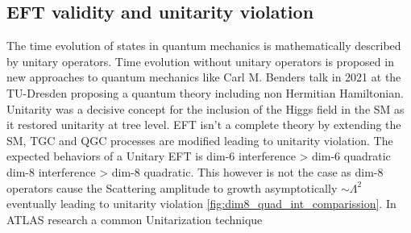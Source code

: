 \documentclass[../Bachelorarbeit.tex]{subfiles}
\begin{document}
\subsection{EFT validity and unitarity violation}

The time evolution of states in quantum mechanics is mathematically described by unitary operators. Time evolution without unitary operators is proposed in new approaches to quantum mechanics like Carl M. Benders talk in 2021 at the TU-Dresden
proposing a quantum theory including non Hermitian Hamiltonian. Unitarity was a decisive concept for the inclusion of the Higgs field in the SM as it restored unitarity at tree level. 
EFT isn't a complete theory by extending the SM, TGC and QGC processes are modified leading to unitarity violation. The expected behaviors of a Unitary EFT is dim-6 interference > dim-6 quadratic ~ dim-8 interference > dim-8 quadratic.
This however is not the case as dim-8 operators cause the Scattering amplitude to growth asymptotically $\sim \Lambda^{2}$ eventually leading to unitarity violation \ref{fig:dim8_quad_int_comparission}.
In ATLAS research a common Unitarization technique
\end{document}
